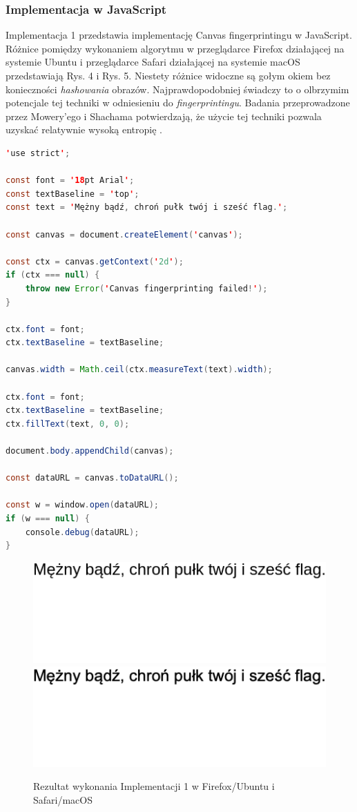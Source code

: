 \subsubsection{Implementacja w JavaScript}
Implementacja 1 przedstawia implementację Canvas fingerprintingu w JavaScript.
Różnice pomiędzy wykonaniem algorytmu w przeglądarce Firefox działającej na
systemie Ubuntu i przeglądarce Safari działającej na systemie macOS
przedstawiają Rys. 4 i Rys. 5. Niestety różnice widoczne są gołym okiem bez
konieczności \emph{hashowania} obrazów. Najprawdopodobniej świadczy to o
olbrzymim potencjale tej techniki w odniesieniu do \emph{fingerprintingu}.
Badania przeprowadzone przez Mowery'ego i Shachama potwierdzają, że użycie tej
techniki pozwala uzyskać relatywnie wysoką entropię \cite{mowery2012pixel}.

\begin{lstlisting}[float,language=Java,caption=Podstawowy Canvas fingerprinting w JavaScript]
'use strict';

const font = '18pt Arial';
const textBaseline = 'top';
const text = 'Mężny bądź, chroń pułk twój i sześć flag.';

const canvas = document.createElement('canvas');

const ctx = canvas.getContext('2d');
if (ctx === null) {
    throw new Error('Canvas fingerprinting failed!');
}

ctx.font = font;
ctx.textBaseline = textBaseline;

canvas.width = Math.ceil(ctx.measureText(text).width);

ctx.font = font;
ctx.textBaseline = textBaseline;
ctx.fillText(text, 0, 0);

document.body.appendChild(canvas);

const dataURL = canvas.toDataURL();

const w = window.open(dataURL);
if (w === null) {
    console.debug(dataURL);
}
\end{lstlisting}

\begin{figure}
	\includegraphics[trim={0 121px 218px 0},clip,frame]{img/04}
	\includegraphics[trim={0 121px 218px 0},clip,frame]{img/05}
	\caption{Rezultat wykonania Implementacji 1 w Firefox/Ubuntu i Safari/macOS}
\end{figure}

